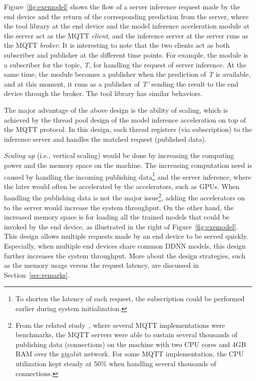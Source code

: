 \documentclass[conference]{IEEEtran}
\def\figurename{Figure}
\begin{document}
\figurename~\ref{fig:exemodel} shows the flow of a server inference request made by the end device and the return of the corresponding prediction from the server, where the tool library at the end device and the model inference acceleration module at the server act as the MQTT \emph{client}, and the inference server at the server runs as the MQTT \emph{broker}. It is interesting to note that the two clients act as both subscriber and publisher at the different time points. For example, the module is a subscriber for the topic, \emph{T}, for handling the request of server inference. At the same time, the module becomes a publisher when the prediction of \emph{T} is available, and at this moment, it runs as a publisher of \emph{T'} sending the result to the end device through the broker. The tool library has similar behaviors.

The major advantage of the above design is the ability of scaling, which is achieved by the thread pool design of the model inference acceleration on top of the MQTT protocol. In this design, each thread registers (via subscription) to the inference server and handles the matched request (published data).

\emph{Scaling up} (i.e., vertical scaling) would be done by increasing the computing power and the memory space on the machine. %
The increasing computation need is caused by handling the incoming publishing data\footnote{To shorten the latency of each request, the subscription could be performed earlier during system initialization.}%
and the server inference, where the later would often be accelerated by the accelerators, such as GPUs. When handling the publishing data is not the major issue\footnote{From the related study~\cite{mqttbenchmark15}, where several MQTT implementations were benchmarks, the MQTT servers were able to sustain several thousands of publishing data (connections) on the machine with two CPU cores and 4GB RAM over the gigabit network. For some MQTT implementation, the CPU utilization kept steady at 50\% when handling several thousands of connections.}, adding the accelerators on to the server would increase the system throughput.
On the other hand, the increased memory space is for loading all the trained models that could be invoked by the end device, as illustrated in the right of \figurename~\ref{fig:exemodel}. This design allows multiple requests made by an end device to be served quickly. Especially, when multiple end devices share common DDNN models, this design further increases the system throughput. More about the design strategies, such as the memory usage versus the request latency, are discussed in Section~\ref{sec:remarks}.
\end{document}
